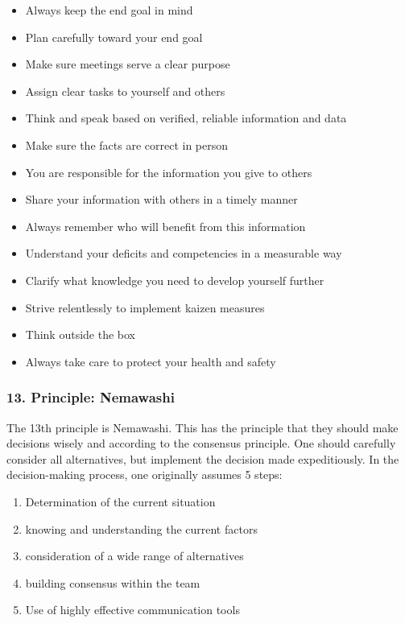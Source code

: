 \documentclass[a4paper,11pt]{article}
\begin{document}
\begin{itemize}
\item Always keep the end goal in mind
\item Plan carefully toward your end goal
\item Make sure meetings serve a clear purpose
\item Assign clear tasks to yourself and others
\item Think and speak based on verified, reliable information and data
\item Make sure the facts are correct in person
\item You are responsible for the information you give to others
\item Share your information with others in a timely manner
\item Always remember who will benefit from this information
\item Understand your deficits and competencies in a measurable way
\item Clarify what knowledge you need to develop yourself further
\item Strive relentlessly to implement kaizen measures
\item Think outside the box
\item Always take care to protect your health and safety
\end{itemize}

\subsubsection*{13. Principle: Nemawashi}

The 13th principle is Nemawashi. This has the principle that they should make
decisions wisely and according to the consensus principle. One should
carefully consider all alternatives, but implement the decision made
expeditiously. In the decision-making process, one originally assumes 5 steps:

\begin{enumerate}
\item Determination of the current situation
\item knowing and understanding the current factors
\item consideration of a wide range of alternatives
\item building consensus within the team
\item Use of highly effective communication tools
\end{enumerate}
\end{document}
